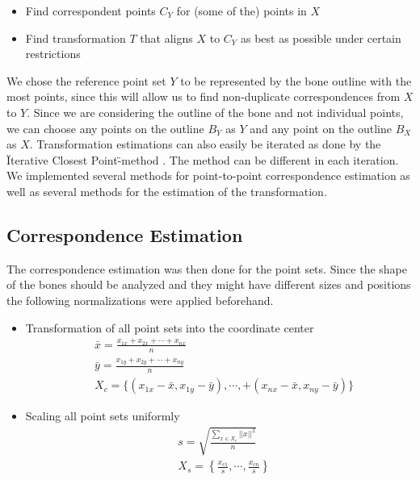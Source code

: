 \documentclass[pdftex,12pt,a4paper]{report}
\begin{document}
\begin{itemize}
\item Find correspondent points $C_Y$ for (some of the) points in $X$
\item Find transformation $T$ that aligns $X$ to $C_Y$ as best as possible under certain restrictions
\end{itemize}

We chose the reference point set $Y$ to be represented by the bone outline with the most points, since this will allow
us to find non-duplicate correspondences from $X$ to $Y$. Since we are considering the outline of the bone and not
individual points, we can choose any points on the outline $B_Y$ as $Y$ and any point on the outline $B_X$ as $X$.
Transformation estimations can also easily be iterated as done by the \"Iterative Closest Point\"-method \cite{besl1992method}.
The method can be different in each iteration. We implemented several methods for point-to-point correspondence
estimation as well as several methods for the estimation of the transformation.

\subsection{Correspondence Estimation}

The correspondence estimation was then done for the point sets. Since the shape of the bones should be
analyzed and they might have different sizes and positions the following normalizations were applied beforehand.

\begin{itemize}
\item Transformation of all point sets into the coordinate center
\begin{equation}
\begin{split}
& \bar{x} = \frac{x_{1x} + x_{2x} + \cdots + x_{nx}}{n} \\
& \bar{y} = \frac{x_{1y} + x_{2y} + \cdots + x_{ny}}{n} \\
& X_c = \{ (x_{1x} - \bar{x}, x_{1y} - \bar{y}), \cdots, + (x_{nx} - \bar{x}, x_{ny} - \bar{y}) \}
\end{split} 
\end{equation}
\item Scaling all point sets uniformly
\begin{equation}
\begin{split}
& s = \sqrt{\frac{\sum\limits_{x \in X_c}||x||^2}{n}} \\
& X_s = \left\{ \frac{x_{c1}}{s}, \cdots, \frac{x_{cn}}{s}\right\}
\end{split}
\end{equation}
\end{itemize}
\end{document}
